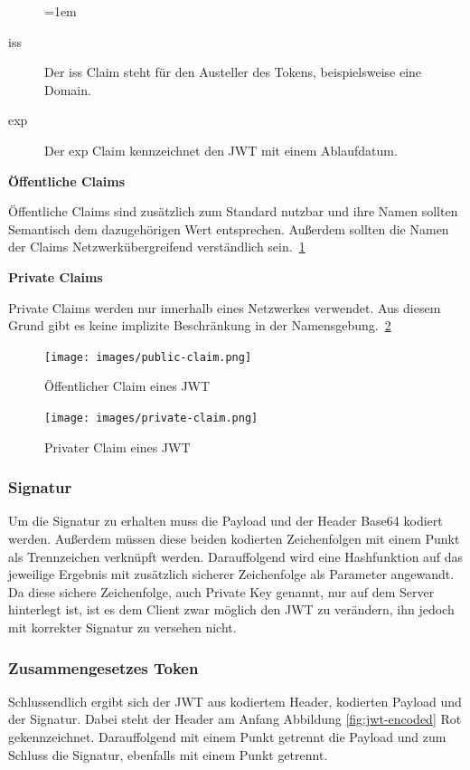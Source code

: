 \documentclass[paper=a4,fontsize=12pt,parskip=half]{scrartcl}
\begin{document}
	\begin{description}
		\leftskip=1em
		\item[iss]
		Der iss Claim steht für den Austeller des Tokens, beispielsweise eine Domain.
		\item[exp] Der exp Claim kennzeichnet den \gls{JWT} mit einem Ablaufdatum.
	\end{description}
	

	\noindent
	\textbf{Öffentliche Claims}

	Öffentliche Claims sind zusätzlich zum Standard nutzbar und ihre Namen sollten Semantisch dem dazugehörigen Wert entsprechen. Außerdem sollten die Namen der Claims Netzwerkübergreifend verständlich sein.~\ref{fig:public-claim}

	\noindent
	\textbf{Private Claims}

	Private Claims werden nur innerhalb eines Netzwerkes verwendet. Aus diesem Grund gibt es keine implizite Beschränkung in der Namensgebung.~\ref{fig:private-claim}  
	
	\begin{figure}[h]
		\centering
		\texttt{[image: images/public-claim.png]}
		\caption{Öffentlicher Claim eines \gls{JWT} }
		\label{fig:public-claim}
	\end{figure}
	
	\begin{figure}[h]
		\centering
		\texttt{[image: images/private-claim.png]}
		\caption{Privater Claim eines \gls{JWT} }
		\label{fig:private-claim}
	\end{figure}
	
	\subsubsection{Signatur}
	\label{sec: jwt_signature}
	
	Um die Signatur zu erhalten muss die Payload und der Header Base64 kodiert werden. Außerdem müssen diese beiden kodierten Zeichenfolgen mit einem Punkt als Trennzeichen verknüpft werden. Darauffolgend wird eine Hashfunktion auf das jeweilige Ergebnis mit zusätzlich sicherer Zeichenfolge als Parameter angewandt. Da diese sichere Zeichenfolge, auch Private Key genannt, nur auf dem Server hinterlegt ist, ist es dem Client zwar möglich den \gls{JWT} zu verändern, ihn jedoch mit korrekter Signatur zu versehen nicht.
	
	\subsubsection{Zusammengesetzes Token}
	\label{sec: jwt_result}
	Schlussendlich ergibt sich der \gls{JWT} aus kodiertem Header, kodierten Payload und der Signatur. Dabei steht der Header am Anfang Abbildung \ref{fig:jwt-encoded} Rot gekennzeichnet. Darauffolgend mit einem Punkt getrennt die Payload und zum Schluss die Signatur, ebenfalls mit einem Punkt getrennt.
	
\end{document}
